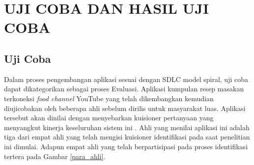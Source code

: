 
\chapter{UJI COBA DAN HASIL UJI COBA}
	\section{Uji Coba}
		Dalam proses pengembangan aplikasi sesuai dengan SDLC model spiral, uji coba dapat dikategorikan sebagai proses Evaluasi. Aplikasi kumpulan resep masakan terkoneksi \textit{food channel} YouTube yang telah dikembangkan kemudian diujicobakan oleh beberapa ahli sebelum dirilis untuk masyarakat luas. Aplikasi tersebut akan dinilai dengan menyebarkan kuisioner pertanyaan yang menyangkut kinerja keseluruhan sistem ini \cite{ardi}. Ahli yang menilai aplikasi ini adalah tiga dari empat ahli yang telah mengisi kuisioner identifikasi pada saat penelitian ini dimulai. Adapun empat ahli yang telah berpartisipasi pada proses identifikasi tertera pada Gambar \ref{para_ahli}.
		
